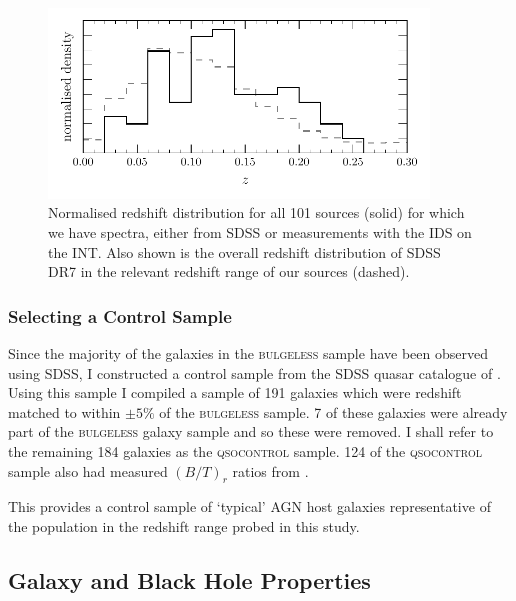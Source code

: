 \begin{figure}
\centering
\includegraphics[width=0.9\textwidth]{agn/z_distribution_101_sdss.pdf}
\caption[Redshift distribution of the \textsc{bulgeless} sample]{Normalised redshift distribution for all 101 sources (solid) for which we have spectra, either from SDSS or measurements with the IDS on the INT. Also shown is the overall redshift distribution of SDSS DR7 in the relevant redshift range of our sources (dashed).
}
\label{fig:redshifts}
\end{figure}

\subsubsection{Selecting a Control Sample}

Since the majority of the galaxies in the \textsc{bulgeless} sample have been observed using SDSS, I constructed a control sample from the SDSS quasar catalogue of \citet{shen11}. Using this sample I compiled a sample of 191 galaxies which were redshift matched to within $\pm5\%$ of the \textsc{bulgeless} sample. 7 of these galaxies were already part of the \textsc{bulgeless} galaxy sample and so these were removed.  I shall refer to the remaining 184 galaxies as the \textsc{qsocontrol} sample. 124 of the \textsc{qsocontrol} sample also had measured $(B/T)_r$ ratios from \citet[][matched with a $3''$ search radius, see Section~\ref{sec:galmass}; see also the middle panel of Figure~\ref{fig:discdomdist} for a comparison of $(B/T)_r$ in the \textsc{bulgeless} and \textsc{qsocontrol} samples]{simard11}. 

This provides a control sample of `typical' AGN host galaxies representative of the population in the redshift range probed in this study. 

%
%
\subsection{Galaxy and Black Hole Properties}\label{sec:masses}
%
%

